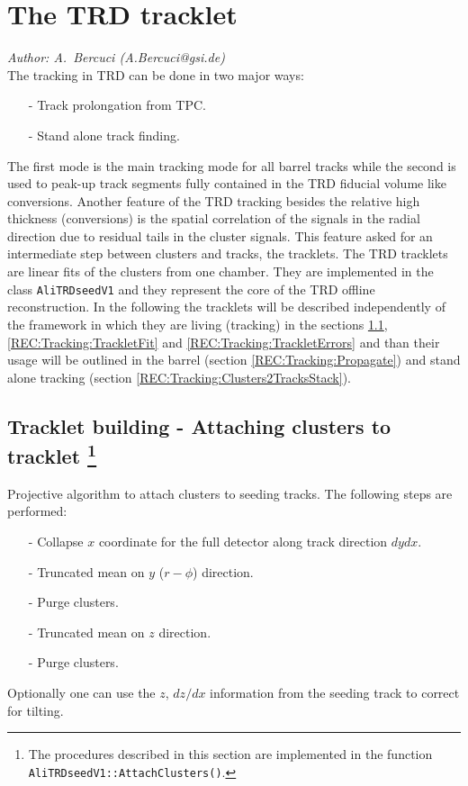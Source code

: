 \documentclass{alicetdr}
\begin{document}
%
\setcounter{footnote}{0}
\section{The TRD tracklet}\label{REC:Tracklet:}
{\it Author: A.~Bercuci (A.Bercuci@gsi.de)}\\

\noindent
The tracking in TRD can be done in two major ways:
\begin{itemize}
\item[-] Track prolongation from TPC.
\item[-] Stand alone track finding.
\end{itemize}
The first mode is the main tracking mode for all barrel tracks while the second 
is used to peak-up track segments fully contained in the TRD fiducial volume 
like conversions. Another feature of the TRD tracking besides the relative high 
thickness (conversions) is the spatial correlation of the signals in the radial 
direction due to residual tails in the cluster signals. This feature asked for 
an intermediate step between clusters and tracks, the tracklets. The TRD 
tracklets are linear fits of the clusters from one chamber. They are implemented 
in the class {\tt AliTRDseedV1} and they represent the core of the TRD offline 
reconstruction. In the following the tracklets will be described independently 
of the framework in which they are living (tracking) in the sections 
\ref{REC:Tracking:TrackletAttach}, \ref{REC:Tracking:TrackletFit} and 
\ref{REC:Tracking:TrackletErrors} and than their usage will be outlined in the 
barrel (section \ref{REC:Tracking:Propagate}) and stand alone tracking (section 
\ref{REC:Tracking:Clusters2TracksStack}).

\subsection[Tracklet building]{Tracklet building - Attaching clusters to tracklet
\footnote{The procedures described in this section are implemented in the function 
{\tt AliTRDseedV1::AttachClusters()}.}}\label{REC:Tracking:TrackletAttach}

Projective algorithm to attach clusters to seeding tracks. The following steps are 
performed:
\begin{enumerate}
\item[-] Collapse $x$ coordinate for the full detector along track direction $dy dx$.
\item[-] Truncated mean on $y$ ($r-\phi$) direction.
\item[-] Purge clusters.
\item[-] Truncated mean on $z$ direction.
\item[-] Purge clusters.
\end{enumerate}
Optionally one can use the $z$, $dz/dx$ information from the seeding track to 
correct for tilting.
	
\end{document}
